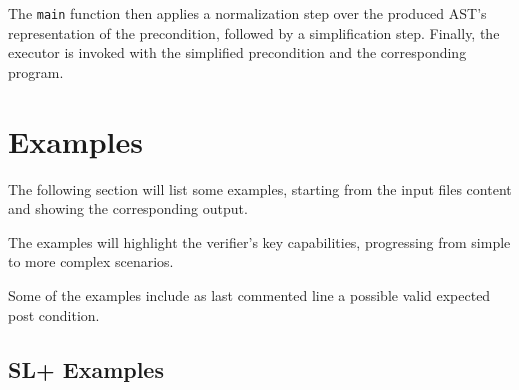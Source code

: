 \documentclass[parskip=half]{scrartcl}
\begin{document}
The \texttt{main} function then applies a normalization step over the produced AST's representation of the precondition, followed by a simplification step.
Finally, the executor is invoked with the simplified precondition and the corresponding program.






















\section{Examples}

The following section will list some examples, starting from the input files content and showing the corresponding output.

The examples will highlight the verifier's key capabilities, progressing from simple to more complex scenarios.

Some of the examples include as last commented line a possible valid expected post condition.  

\subsection{SL+ Examples}
\end{document}
